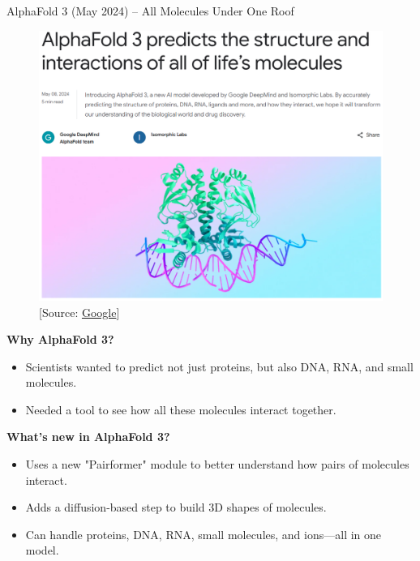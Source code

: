 \begin{frame}[allowframebreaks]{AlphaFold 3 (May 2024) – All Molecules Under One Roof}
    \begin{figure}
        \centering
        \includegraphics[width=\linewidth,height=0.9\textheight,keepaspectratio]{images/science/alphafold-3-paper.png}
        [Source: \href{https://blog.google/technology/ai/google-deepmind-isomorphic-alphafold-3-ai-model/}{Google}]
    \end{figure}

    \framebreak

    \textbf{Why AlphaFold 3?}
    \begin{itemize}
        \item Scientists wanted to predict not just proteins, but also DNA, RNA, and small molecules.
        \item Needed a tool to see how all these molecules interact together.
    \end{itemize}

    \textbf{What's new in AlphaFold 3?}
    \begin{itemize}
        \item Uses a new "Pairformer" module to better understand how pairs of molecules interact.
        \item Adds a diffusion-based step to build 3D shapes of molecules.
        \item Can handle proteins, DNA, RNA, small molecules, and ions—all in one model.
    \end{itemize}

    \framebreak


\end{frame}
